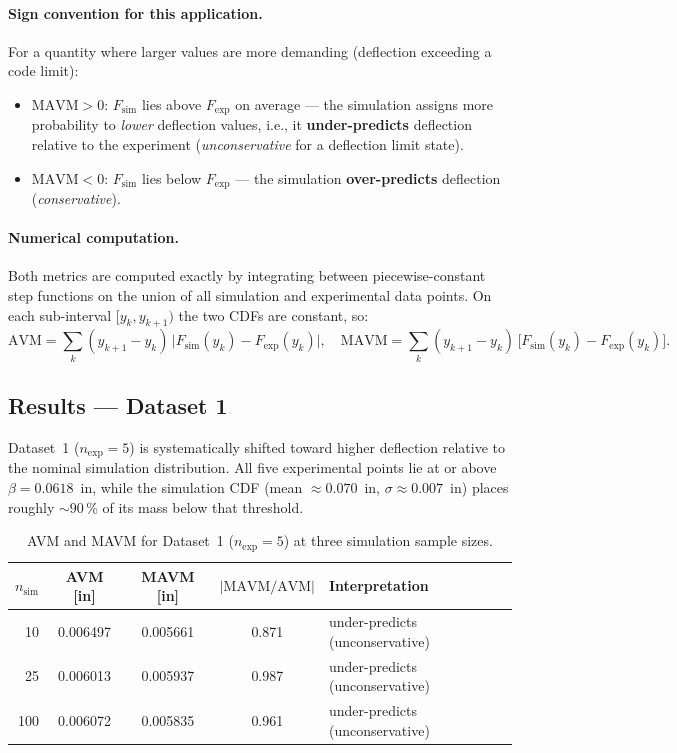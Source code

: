 \documentclass[11pt,letterpaper]{article}
\newcommand{\AVM}{\mathrm{AVM}}
\newcommand{\MAVM}{\mathrm{MAVM}}
\newcommand{\Fsim}{F_{\mathrm{sim}}}
\newcommand{\Fexp}{F_{\mathrm{exp}}}
\begin{document}
\paragraph{Sign convention for this application.}
For a quantity where larger values are more demanding (deflection exceeding a
code limit):
\begin{itemize}[nosep]
  \item $\MAVM > 0$: $\Fsim$ lies above $\Fexp$ on average — the simulation
        assigns more probability to \emph{lower} deflection values, i.e., it
        \textbf{under-predicts} deflection relative to the experiment
        (\emph{unconservative} for a deflection limit state).
  \item $\MAVM < 0$: $\Fsim$ lies below $\Fexp$ — the simulation
        \textbf{over-predicts} deflection (\emph{conservative}).
\end{itemize}

\paragraph{Numerical computation.}
Both metrics are computed exactly by integrating between piecewise-constant step
functions on the union of all simulation and experimental data points.  On each
sub-interval $[y_k, y_{k+1})$ the two CDFs are constant, so:
\begin{equation}
  \AVM  = \sum_k (y_{k+1}-y_k)\,\bigl|\Fsim(y_k) - \Fexp(y_k)\bigr|, \quad
  \MAVM = \sum_k (y_{k+1}-y_k)\,\bigl[\Fsim(y_k) - \Fexp(y_k)\bigr].
  \label{eq:numeric}
\end{equation}

\subsection{Results — Dataset 1}

Dataset~1 ($n_{\mathrm{exp}}=5$) is systematically shifted toward higher deflection
relative to the nominal simulation distribution.
All five experimental points lie at or above $\beta = 0.0618$~in,
while the simulation CDF (mean $\approx 0.070$~in, $\sigma\approx0.007$~in)
places roughly ${\sim}90\,\%$ of its mass below that threshold.

\begin{table}[h!]
\centering
\caption{AVM and MAVM for Dataset~1 ($n_{\mathrm{exp}}=5$) at three simulation sample sizes.}
\label{tab:avm_ds1}
\small
\begin{tabular}{rcccl}
  \toprule
  $n_{\mathrm{sim}}$ & AVM [in] & MAVM [in] & $|\MAVM/\AVM|$ & Interpretation \\
  \midrule
   10 & 0.006497 & 0.005661 & 0.871 & under-predicts (unconservative) \\
   25 & 0.006013 & 0.005937 & 0.987 & under-predicts (unconservative) \\
  100 & 0.006072 & 0.005835 & 0.961 & under-predicts (unconservative) \\
  \bottomrule
\end{tabular}
\end{table}
\end{document}
